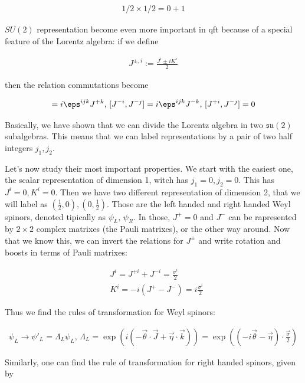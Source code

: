 \documentclass{report}
\begin{document}
\begin{align}
    1/2 \times 1/2 = 0 + 1 
\end{align}

\(SU(2)\) representation become even more important in qft because of a special feature of the Lorentz algebra: if we define 

\begin{align}
    J^{\pm, i} := \frac{J^i \pm iK^i}{2}
\end{align}

then the relation commutations become 

\begin{align}
    [J^{+i}, J^{+j}] = i\eps^{ijk}J^{+k}, \, [J^{-i}, J^{-j}] = i\eps^{ijk}J^{-k}, \, [J^{+i}, J^{-j}] = 0
\end{align}

Basically, we have shown that we can divide the Lorentz algebra in two \(\mathfrak{su}(2)\) subalgebras. This means that we can label representations by a pair of two half integers \(j_1, j_2\).  

Let's now study their most important properties. We start with the easiest one, the scalar representation of dimension 1, witch has \(j_1 =0, j_2 = 0\). This has \(J^i = 0, K^i = 0\). Then we have two different representation of dimension 2, that we will label as \(\left(\frac{1}{2}, 0 \right), \left(0, \frac{1}{2}\right)\). Those are the left handed and right handed Weyl spinors, denoted tipically as \(\psi_L, \, \psi_R\). In those, \(J^+ = 0\) and \(J^-\) can be rapresented by \(2\times 2\) complex matrixes (the Pauli matrixes), or the other way around. Now that we know this, we can invert the relations for \(J^{\pm}\) and write rotation and boosts in terms of Pauli matrixes: 

\begin{align}
    &J^i = J^{+i} + J^{-i} = \frac{\sigma^i}{2} \\
    &K^i = -i(J^{+}-J^{-}) = i\frac{\sigma^i}{2}
\end{align}

Thus we find the rules of transformation for Weyl spinors: 

\begin{align}
    \psi_L \rightarrow \psi'_L = \Lambda_L\psi_L, \, \Lambda_L = \exp\left(i (-\vec{\theta}\cdot \vec{J} + \vec{\eta}\cdot \vec{k}) \right) = \exp\left( (-i\vec{\theta}- \vec{\eta})\cdot \frac{\vec{\sigma}}{2} \right)
\end{align}

Similarly, one can find the rule of transformation for right handed spinors, given by 
\end{document}
